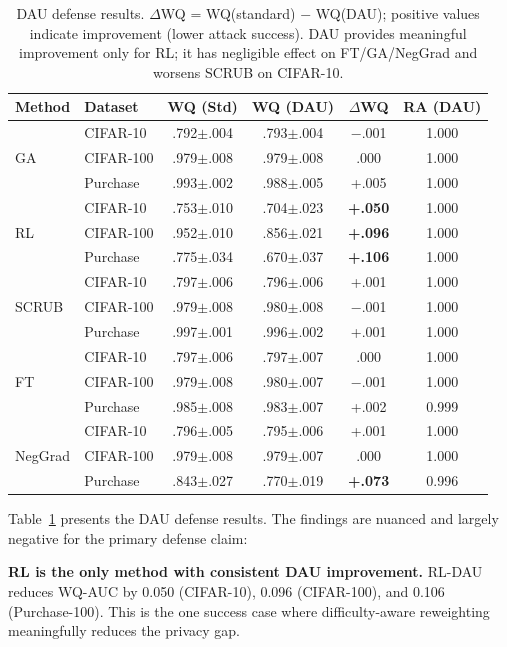 \documentclass{article}
\begin{document}
\begin{table}[t]
\caption{DAU defense results. $\Delta$WQ = WQ(standard) $-$ WQ(DAU); positive values indicate improvement (lower attack success). DAU provides meaningful improvement only for RL; it has negligible effect on FT/GA/NegGrad and worsens SCRUB on CIFAR-10.}
\label{tab:dau}
\centering
\small
\begin{tabular}{ll ccc c}
\toprule
Method & Dataset & WQ (Std) & WQ (DAU) & $\Delta$WQ & RA (DAU) \\
\midrule
\multirow{3}{*}{GA} & CIFAR-10 & .792$\pm$.004 & .793$\pm$.004 & $-$.001 & 1.000 \\
& CIFAR-100 & .979$\pm$.008 & .979$\pm$.008 & .000 & 1.000 \\
& Purchase & .993$\pm$.002 & .988$\pm$.005 & +.005 & 1.000 \\
\midrule
\multirow{3}{*}{RL} & CIFAR-10 & .753$\pm$.010 & .704$\pm$.023 & \textbf{+.050} & 1.000 \\
& CIFAR-100 & .952$\pm$.010 & .856$\pm$.021 & \textbf{+.096} & 1.000 \\
& Purchase & .775$\pm$.034 & .670$\pm$.037 & \textbf{+.106} & 1.000 \\
\midrule
\multirow{3}{*}{SCRUB} & CIFAR-10 & .797$\pm$.006 & .796$\pm$.006 & +.001 & 1.000 \\
& CIFAR-100 & .979$\pm$.008 & .980$\pm$.008 & $-$.001 & 1.000 \\
& Purchase & .997$\pm$.001 & .996$\pm$.002 & +.001 & 1.000 \\
\midrule
\multirow{3}{*}{FT} & CIFAR-10 & .797$\pm$.006 & .797$\pm$.007 & .000 & 1.000 \\
& CIFAR-100 & .979$\pm$.008 & .980$\pm$.007 & $-$.001 & 1.000 \\
& Purchase & .985$\pm$.008 & .983$\pm$.007 & +.002 & 0.999 \\
\midrule
\multirow{3}{*}{NegGrad} & CIFAR-10 & .796$\pm$.005 & .795$\pm$.006 & +.001 & 1.000 \\
& CIFAR-100 & .979$\pm$.008 & .979$\pm$.007 & .000 & 1.000 \\
& Purchase & .843$\pm$.027 & .770$\pm$.019 & \textbf{+.073} & 0.996 \\
\bottomrule
\end{tabular}
\end{table}

Table~\ref{tab:dau} presents the DAU defense results.
The findings are nuanced and largely negative for the primary defense claim:

\textbf{RL is the only method with consistent DAU improvement.}
RL-DAU reduces WQ-AUC by 0.050 (CIFAR-10), 0.096 (CIFAR-100), and 0.106 (Purchase-100).
This is the one success case where difficulty-aware reweighting meaningfully reduces the privacy gap.
\end{document}
